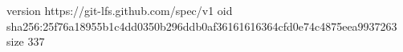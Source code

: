 version https://git-lfs.github.com/spec/v1
oid sha256:25f76a18955b1c4dd0350b296ddb0af36161616364cfd0e74c4875eea9937263
size 337
